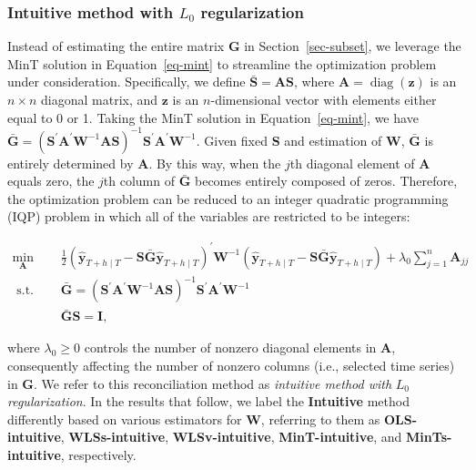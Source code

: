 \documentclass[11pt,a4paper,]{article}
\begin{document}
\hypertarget{sec-intuitive}{%
\subsubsection{\texorpdfstring{Intuitive method with \(L_0\)
regularization}{Intuitive method with L\_0 regularization}}\label{sec-intuitive}}

Instead of estimating the entire matrix \(\boldsymbol{G}\) in
Section~\ref{sec-subset}, we leverage the MinT solution in
Equation~\ref{eq-mint} to streamline the optimization problem under
consideration. Specifically, we define
\(\bar{\boldsymbol{S}} = \boldsymbol{A}\boldsymbol{S}\), where
\(\boldsymbol{A} = \operatorname{diag}(\boldsymbol{z})\) is an
\(n \times n\) diagonal matrix, and \(\boldsymbol{z}\) is an
\(n\)-dimensional vector with elements either equal to 0 or 1. Taking
the MinT solution in Equation~\ref{eq-mint}, we have
\(\bar{\boldsymbol{G}} = (\boldsymbol{S}^{\prime}\boldsymbol{A}^{\prime}\boldsymbol{W}^{-1}\boldsymbol{A}\boldsymbol{S})^{-1}\boldsymbol{S}^{\prime}\boldsymbol{A}^{\prime}\boldsymbol{W}^{-1}\).
Given fixed \(\boldsymbol{S}\) and estimation of \(\boldsymbol{W}\),
\(\bar{\boldsymbol{G}}\) is entirely determined by \(\boldsymbol{A}\).
By this way, when the \(j\)th diagonal element of \(\boldsymbol{A}\)
equals zero, the \(j\)th column of \(\bar{\boldsymbol{G}}\) becomes
entirely composed of zeros. Therefore, the optimization problem can be
reduced to an integer quadratic programming (IQP) problem in which all
of the variables are restricted to be integers:

\[
\begin{aligned}
\min _{\boldsymbol{A}} \quad & \frac{1}{2}\left(\hat{\boldsymbol{y}}_{T+h \mid T}-\boldsymbol{S}\bar{\boldsymbol{G}}\hat{\boldsymbol{y}}_{T+h \mid T}\right)^{\prime} \boldsymbol{W}^{-1}\left(\hat{\boldsymbol{y}}_{T+h \mid T}-\boldsymbol{S}\bar{\boldsymbol{G}}\hat{\boldsymbol{y}}_{T+h \mid T}\right) + \lambda_0 \sum_{j=1}^n \boldsymbol{A}_{jj} \\
\text { s.t. } \quad & \bar{\boldsymbol{G}} = (\boldsymbol{S}^{\prime}\boldsymbol{A}^{\prime}\boldsymbol{W}^{-1}\boldsymbol{A}\boldsymbol{S})^{-1}\boldsymbol{S}^{\prime}\boldsymbol{A}^{\prime}\boldsymbol{W}^{-1} \\
& \bar{\boldsymbol{G}}\boldsymbol{S} = \boldsymbol{I},
\end{aligned}
\]

where \(\lambda_0 \geq 0\) controls the number of nonzero diagonal
elements in \(\boldsymbol{A}\), consequently affecting the number of
nonzero columns (i.e., selected time series) in \(\boldsymbol{G}\). We
refer to this reconciliation method as \emph{intuitive method with}
\(L_0\) \emph{regularization}. In the results that follow, we label the
\textbf{Intuitive} method differently based on various estimators for
\(\boldsymbol{W}\), referring to them as \textbf{OLS-intuitive},
\textbf{WLSs-intuitive}, \textbf{WLSv-intuitive},
\textbf{MinT-intuitive}, and \textbf{MinTs-intuitive}, respectively.
\end{document}
